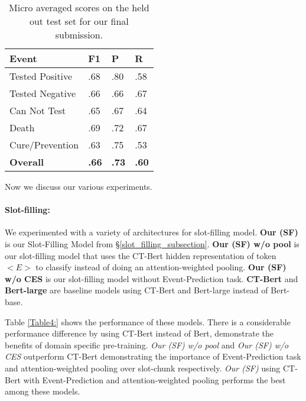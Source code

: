 \documentclass[11pt,a4paper]{article}
\begin{document}
\begin{table}
 \begin{center}
  \begin{tabular}{p{2.5cm}|p{0.5cm}p{0.5cm}p{0.5cm}}
   \hline
   \textbf{Event} & \textbf{F1} & \textbf{P} & \textbf{R}\\ 
   \hline
   Tested Positive & .68 & .80 & .58 \\
   Tested Negative & .66 & .66 & .67 \\
   Can Not Test  & .65 & .67 & .64 \\
   Death           & .69 & .72 & .67 \\
   Cure/Prevention & .63 & .75 & .53 \\
   \hline
   \hline
   \textbf{Overall}         & \textbf{.66} & \textbf{.73} & \textbf{.60} \\
   \hline
  \end{tabular}
  \caption{\label{Table3:} Micro averaged scores on the held out test set for our final submission.}
 \end{center}
\end{table}

Now we discuss our various experiments.

\paragraph{Slot-filling:}

We experimented with a variety of architectures for slot-filling model. \textbf{Our (SF)} is our Slot-Filling Model from \S\ref{slot_filling_subsection}. \textbf{Our (SF) w/o pool} is our slot-filling model that uses the CT-Bert hidden representation of token $<E>$ to classify instead of doing an attention-weighted pooling. \textbf{Our (SF) w/o CES} is our slot-filling model without Event-Prediction task. \textbf{CT-Bert} and \textbf{Bert-large} are baseline models using CT-Bert and Bert-large instead of Bert-base.

Table \ref{Table4:} shows the performance of these models. There is a considerable performance difference by using CT-Bert instead of Bert, demonstrate the benefits of domain specific pre-training.
\textit{Our (SF) w/o pool} and \textit{Our (SF) w/o CES} outperform CT-Bert demonstrating the importance of Event-Prediction task and  attention-weighted pooling over slot-chunk respectively.
\textit{Our (SF)} using CT-Bert with Event-Prediction and attention-weighted pooling performs the best among these models.
\end{document}
